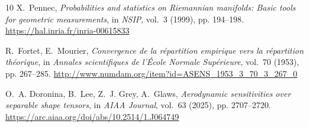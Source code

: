 \documentclass[pdflatex,iicol]{sn-jnl}%
\theoremstyle{thmstyleone}%
\theoremstyle{thmstyletwo}%
\theoremstyle{thmstylethree}%
\begin{document}
\begin{thebibliography}{10}
X.~Pennec, \emph{Probabilities and statistics on {R}iemannian manifolds: Basic tools for geometric measurements}, in \emph{NSIP}, vol.~3 (1999), pp. 194--198.
\newblock \urlprefix\url{https://hal.inria.fr/inria-00615833}

R.~Fortet, E.~Mourier, \emph{Convergence de la r{\'e}partition empirique vers la r{\'e}partition th{\'e}orique}, in \emph{Annales scientifiques de l'{\'E}cole Normale Sup{\'e}rieure}, vol.~70 (1953), pp. 267--285.
\newblock \urlprefix\url{http://www.numdam.org/item?id=ASENS_1953_3_70_3_267_0}

O.~A. Doronina, B.~Lee, Z.~J. Grey, A.~Glaws, \emph{Aerodynamic sensitivities over separable shape tensors}, in \emph{AIAA Journal}, vol.~63 (2025), pp. 2707--2720.
\newblock \urlprefix\url{https://arc.aiaa.org/doi/abs/10.2514/1.J064749}

\end{thebibliography}
\end{document}
